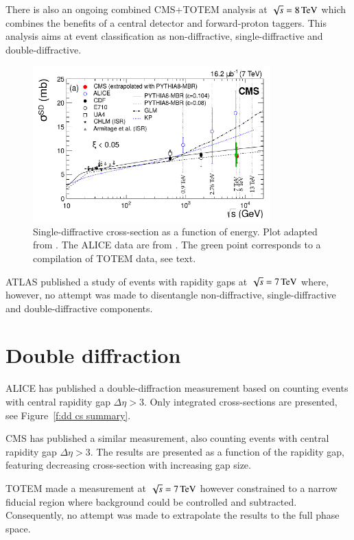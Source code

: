 \documentclass{webofc}
\def\un#1{\,{\rm #1}}
\begin{document}
There is also an ongoing combined CMS+TOTEM analysis at $\sqrt s = 8\un{TeV}$ which combines the benefits of a central detector and forward-proton taggers. This analysis aims at event classification as non-diffractive, single-diffractive and double-diffractive.

\begin{figure}[h]
\centering
\includegraphics[height=6cm,clip]{fig/si_sd_vs_s.pdf}
\vskip-4mm
\caption{Single-diffractive cross-section as a function of energy. Plot adapted from \cite{cms-diff-7tev}. The ALICE data are from \cite{alice-inel-sd-dd}. The green point corresponds to a compilation of TOTEM data, see text.
}
\label{f:sd cs summary}
\end{figure}

ATLAS published a study of events with rapidity gaps \cite{atlas-rap-gap-7tev} at $\sqrt s = 7\un{TeV}$ where, however, no attempt was made to disentangle non-diffractive, single-diffractive and double-diffractive components.


\section{Double diffraction}
\label{s:dd}

ALICE has published \cite{alice-inel-sd-dd} a double-diffraction measurement based on counting events with central rapidity gap $\Delta\eta > 3$. Only integrated cross-sections are presented, see Figure~\ref{f:dd cs summary}.

CMS has published \cite{cms-diff-7tev} a similar measurement, also counting events with central rapidity gap $\Delta\eta > 3$. The results are presented as a function of the rapidity gap, featuring decreasing cross-section with increasing gap size.

TOTEM made a measurement at $\sqrt s = 7\un{TeV}$ \cite{totem-dd-7tev} however constrained to a narrow fiducial region where background could be controlled and subtracted. Consequently, no attempt was made to extrapolate the results to the full phase space.
\end{document}
